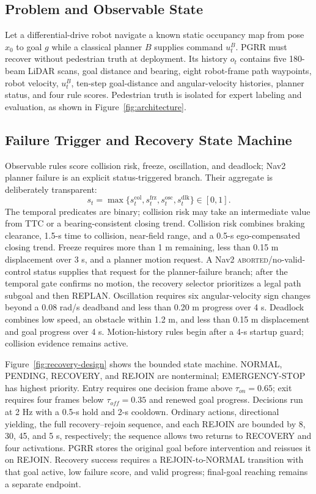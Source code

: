 \subsection{Problem and Observable State}
Let a differential-drive robot navigate a known static occupancy map from pose
$x_0$ to goal $g$ while a classical planner $B$ supplies command $u^B_t$.  PGRR
must recover without pedestrian truth at deployment.  Its history $o_t$ contains
five 180-beam LiDAR scans, goal distance and bearing, eight robot-frame path
waypoints, robot velocity, $u^B_t$, ten-step goal-distance and angular-velocity
histories, planner status, and four rule scores.  Pedestrian truth is isolated
for expert labeling and evaluation, as shown in Figure~\ref{fig:architecture}.

\subsection{Failure Trigger and Recovery State Machine}
Observable rules score collision risk, freeze, oscillation, and deadlock;
Nav2 planner failure is an explicit status-triggered branch.
Their aggregate is deliberately transparent:
\begin{equation}
 s_t=\max\{s_t^{\mathrm{col}},s_t^{\mathrm{frz}},
 s_t^{\mathrm{osc}},s_t^{\mathrm{dlk}}\}\in[0,1].
\end{equation}
The temporal predicates are binary; collision risk may take an intermediate
value from TTC or a bearing-consistent closing trend.
Collision risk combines braking clearance, 1.5-s time to collision, near-field
range, and a 0.5-s ego-compensated closing trend.  Freeze requires more than
1 m remaining, less than 0.15 m displacement over 3 s, and a planner motion
request.  A Nav2 \textsc{aborted}/no-valid-control status supplies that request
for the planner-failure branch; after the temporal gate confirms no motion, the
recovery selector prioritizes a legal path subgoal and then REPLAN.  Oscillation
requires six angular-velocity sign changes beyond a 0.08 rad/s deadband and less
than 0.20 m progress over 4 s.  Deadlock combines
low speed, an obstacle within 1.2 m, and less than 0.15 m displacement and goal
progress over 4 s.  Motion-history rules begin after a 4-s startup guard;
collision evidence remains active.

Figure~\ref{fig:recovery-design} shows the bounded state machine.  NORMAL,
PENDING, RECOVERY, and REJOIN are nonterminal; EMERGENCY-STOP has highest
priority.  Entry requires one decision frame above $\tau_{on}=0.65$; exit
requires four frames below $\tau_{off}=0.35$ and renewed goal progress.
Decisions run at 2 Hz with a 0.5-s hold and 2-s cooldown.  Ordinary actions,
directional yielding, the full recovery--rejoin sequence, and each REJOIN are
bounded by 8, 30, 45, and 5 s, respectively; the sequence allows two returns to
RECOVERY and four activations.  PGRR stores the original goal before
intervention and reissues it on REJOIN.  Recovery success requires a
REJOIN-to-NORMAL transition with that goal active, low failure score, and valid
progress; final-goal reaching remains a separate endpoint.

